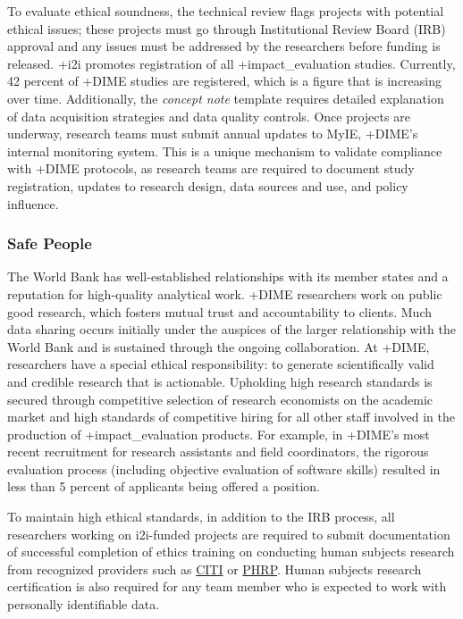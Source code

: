 \documentclass[
]{WileySix}
\begin{document}
To evaluate ethical soundness, the technical review flags projects with potential ethical issues; these projects must go through Institutional Review Board (IRB) approval and any issues must be addressed by the researchers before funding is released. +i2i\textbar{} promotes registration of all +impact\_evaluation\textbar{} studies. Currently, 42 percent of +DIME\textbar{} studies are registered, which is a figure that is increasing over time. Additionally, the \emph{concept note} template requires detailed explanation of data acquisition strategies and data quality controls. Once projects are underway, research teams must submit annual updates to MyIE, +DIME\textbar's internal monitoring system. This is a unique mechanism to validate compliance with +DIME\textbar{} protocols, as research teams are required to document study registration, updates to research design, data sources and use, and policy influence.

\hypertarget{safe-people-7}{%
\subsubsection{Safe People}\label{safe-people-7}}

The World Bank has well-established relationships with its member states and a reputation for high-quality analytical work. +DIME\textbar{} researchers work on public good research, which fosters mutual trust and accountability to clients. Much data sharing occurs initially under the auspices of the larger relationship with the World Bank and is sustained through the ongoing collaboration. At +DIME\textbar, researchers have a special ethical responsibility: to generate scientifically valid and credible research that is actionable. Upholding high research standards is secured through competitive selection of research economists on the academic market and high standards of competitive hiring for all other staff involved in the production of +impact\_evaluation\textbar{} products. For example, in +DIME\textbar's most recent recruitment for research assistants and field coordinators, the rigorous evaluation process (including objective evaluation of software skills) resulted in less than 5 percent of applicants being offered a position.

To maintain high ethical standards, in addition to the IRB process, all researchers working on i2i-funded projects are required to submit documentation of successful completion of ethics training on conducting human subjects research from recognized providers such as \href{https://about.citiprogram.org/en/homepage/}{CITI} or \href{https://phrptraining.com/}{PHRP}. Human subjects research certification is also required for any team member who is expected to work with personally identifiable data.
\end{document}
